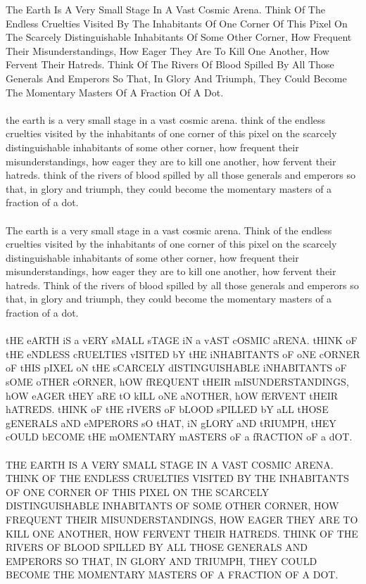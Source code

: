 {\begin{testcases}
{The Earth Is A Very Small Stage In A Vast Cosmic Arena. Think Of The Endless Cruelties Visited By The Inhabitants Of One Corner Of This Pixel On The Scarcely Distinguishable Inhabitants Of Some Other Corner, How Frequent Their Misunderstandings, How Eager They Are To Kill One Another, How Fervent Their Hatreds. Think Of The Rivers Of Blood Spilled By All Those Generals And Emperors So That, In Glory And Triumph, They Could Become The Momentary Masters Of A Fraction Of A Dot.\\\\
the earth is a very small stage in a vast cosmic arena. think of the endless cruelties visited by the inhabitants of one corner of this pixel on the scarcely distinguishable inhabitants of some other corner, how frequent their misunderstandings, how eager they are to kill one another, how fervent their hatreds. think of the rivers of blood spilled by all those generals and emperors so that, in glory and triumph, they could become the momentary masters of a fraction of a dot.\\\\
The earth is a very small stage in a vast cosmic arena. Think of the endless cruelties visited by the inhabitants of one corner of this pixel on the scarcely distinguishable inhabitants of some other corner, how frequent their misunderstandings, how eager they are to kill one another, how fervent their hatreds. Think of the rivers of blood spilled by all those generals and emperors so that, in glory and triumph, they could become the momentary masters of a fraction of a dot.\\\\
tHE eARTH iS a vERY sMALL sTAGE iN a vAST cOSMIC aRENA. tHINK oF tHE eNDLESS cRUELTIES vISITED bY tHE iNHABITANTS oF oNE cORNER oF tHIS pIXEL oN tHE sCARCELY dISTINGUISHABLE iNHABITANTS oF sOME oTHER cORNER, hOW fREQUENT tHEIR mISUNDERSTANDINGS, hOW eAGER tHEY aRE tO kILL oNE aNOTHER, hOW fERVENT tHEIR hATREDS. tHINK oF tHE rIVERS oF bLOOD sPILLED bY aLL tHOSE gENERALS aND eMPERORS sO tHAT, iN gLORY aND tRIUMPH, tHEY cOULD bECOME tHE mOMENTARY mASTERS oF a fRACTION oF a dOT.\\\\
THE EARTH IS A VERY SMALL STAGE IN A VAST COSMIC ARENA. THINK OF THE ENDLESS CRUELTIES VISITED BY THE INHABITANTS OF ONE CORNER OF THIS PIXEL ON THE SCARCELY DISTINGUISHABLE INHABITANTS OF SOME OTHER CORNER, HOW FREQUENT THEIR MISUNDERSTANDINGS, HOW EAGER THEY ARE TO KILL ONE ANOTHER, HOW FERVENT THEIR HATREDS. THINK OF THE RIVERS OF BLOOD SPILLED BY ALL THOSE GENERALS AND EMPERORS SO THAT, IN GLORY AND TRIUMPH, THEY COULD BECOME THE MOMENTARY MASTERS OF A FRACTION OF A DOT.}

\end{testcases}}
